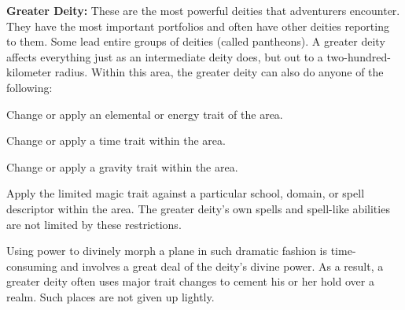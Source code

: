 \textbf{Greater Deity:} These are the most powerful deities that adventurers encounter. They have the most important portfolios and often have other deities reporting to them. Some lead entire groups of deities (called pantheons). A greater deity affects everything just as an intermediate deity does, but out to a two-hundred-kilometer radius. Within this area, the greater deity can also do anyone of the following:

\begin{itemize*}
\item Change or apply an elemental or energy trait of the area.
\item Change or apply a time trait within the area.
\item Change or apply a gravity trait within the area.
\item Apply the limited magic trait against a particular school, domain, or spell descriptor within the area. The greater deity's own spells and spell-like abilities are not limited by these restrictions.
\end{itemize*}

Using power to divinely morph a plane in such dramatic fashion is time-consuming and involves a great deal of the deity's divine power. As a result, a greater deity often uses major trait changes to cement his or her hold over a realm. Such places are not given up lightly.







% 
% 
% 
% 
% 
% 
% 
% 
% 
% 
% 
